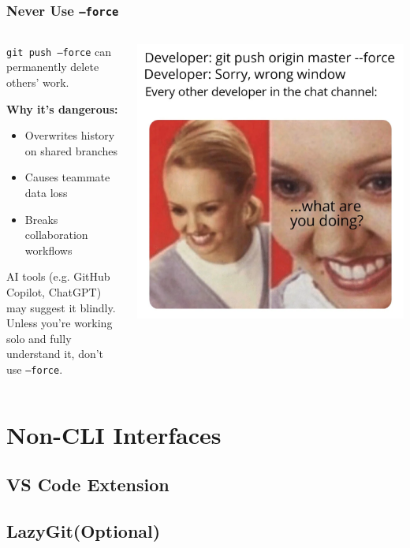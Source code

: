 \documentclass[aspectratio=169]{beamer}
\begin{document}
\begin{frame}
  \frametitle{Never Use \texttt{--force}}

  \begin{columns}
    \begin{column}{0.6\textwidth}
      \texttt{git push --force} can permanently delete others' work.

      \vspace{0.6em}
      \textbf{Why it's dangerous:}
      \begin{itemize}
        \item Overwrites history on shared branches
        \item Causes teammate data loss
        \item Breaks collaboration workflows
      \end{itemize}

      \vspace{0.6em}
      AI tools (e.g. GitHub Copilot, ChatGPT) may suggest it blindly.\\
      Unless you're working solo and fully understand it, don't use \texttt{--force}.
    \end{column}

    \begin{column}{0.4\textwidth}
      \includegraphics[width=\textwidth]{img/git-force1.png}
    \end{column}
  \end{columns}
\end{frame}








  
\section{Non-CLI Interfaces}
\subsection{VS Code Extension}
\subsection{LazyGit(Optional)}
\end{document}
